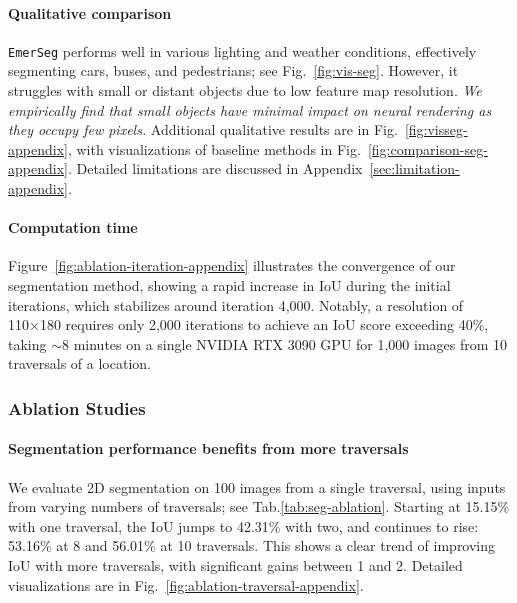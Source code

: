 \paragraph{Qualitative comparison} \texttt{EmerSeg} performs well in various lighting and weather conditions, effectively segmenting cars, buses, and pedestrians; see Fig.~\ref{fig:vis-seg}. However, it struggles with small or distant objects due to low feature map resolution. \textit{We empirically find that small objects have minimal impact on neural rendering as they occupy few pixels.} Additional qualitative results are in Fig.~\ref{fig:visseg-appendix}, with visualizations of baseline methods in Fig.~\ref{fig:comparison-seg-appendix}. Detailed limitations are discussed in Appendix~\ref{sec:limitation-appendix}.


\paragraph{Computation time} Figure~\ref{fig:ablation-iteration-appendix} illustrates the convergence of our segmentation method, showing a rapid increase in IoU during the initial iterations, which stabilizes around iteration 4,000. Notably, a resolution of 110×180 requires only 2,000 iterations to achieve an IoU score exceeding 40\%, taking  $\sim$8 minutes on a single NVIDIA RTX 3090 GPU for 1,000 images from 10 traversals of a location.

\subsubsection{Ablation Studies}
\label{subsubsec:ablation-seg}
\paragraph{Segmentation performance benefits from more traversals} We evaluate 2D segmentation on 100 images from a single traversal, using inputs from varying numbers of traversals; see Tab.\ref{tab:seg-ablation}. Starting at 15.15\% with one traversal, the IoU jumps to 42.31\% with two, and continues to rise: 53.16\% at 8 and 56.01\% at 10 traversals. This shows a clear trend of improving IoU with more traversals, with significant gains between 1 and 2. Detailed visualizations are in Fig.~\ref{fig:ablation-traversal-appendix}.

